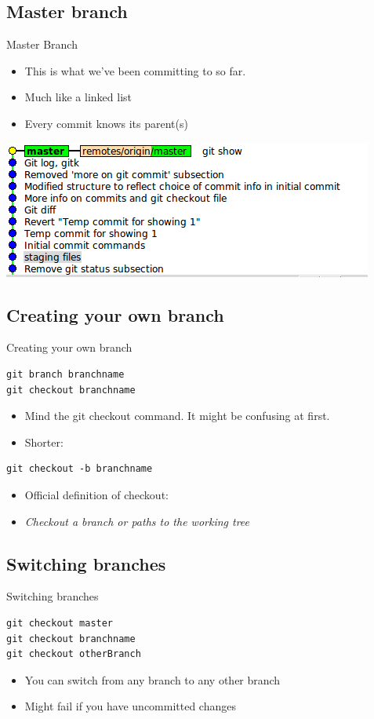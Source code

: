 \documentclass[10pt,a4paper]{beamer}
\begin{document}
\subsection{Master branch}
\begin{frame}{Master Branch}
\begin{itemize}
\item This is what we've been committing to so far.
\item Much like a linked list
\item Every commit knows its parent(s)
\end{itemize}
\includegraphics[width=\linewidth]{masterbranch.png}
\end{frame}

\subsection{Creating your own branch}
\begin{frame}[fragile]{Creating your own branch}
\begin{verbatim}
git branch branchname
git checkout branchname
\end{verbatim}
\begin{itemize}
\item Mind the git checkout command. It might be confusing at first.
\item Shorter:
\end{itemize}

\begin{verbatim}
git checkout -b branchname
\end{verbatim}
\begin{itemize}
\item Official definition of checkout:
\item \textit{Checkout a branch or paths to the working tree}
\end{itemize}
\end{frame}

\subsection{Switching branches}
\begin{frame}[fragile]{Switching branches}
\begin{verbatim}
git checkout master
git checkout branchname
git checkout otherBranch
\end{verbatim}
\begin{itemize}
\item You can switch from any branch to any other branch
\item Might fail if you have uncommitted changes
\end{itemize}
\end{frame}
\end{document}
